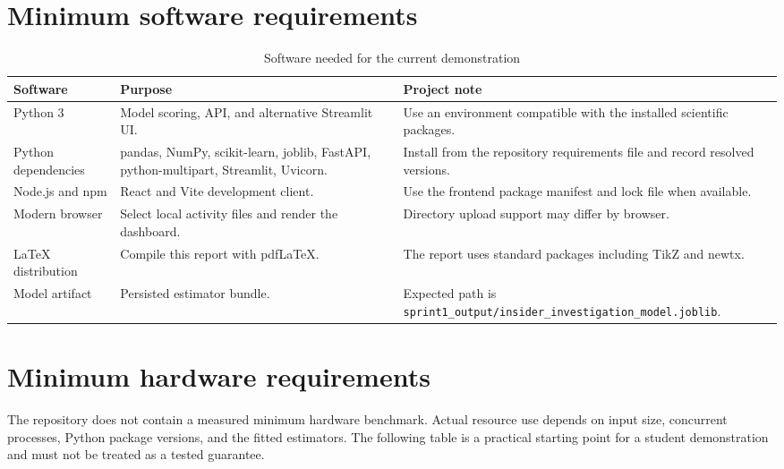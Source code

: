 \documentclass[12pt,a4paper,oneside]{report}
\newcommand{\tablefont}{\small}
\newcommand{\code}[1]{\texttt{\small #1}}
\begin{document}
\section{Minimum software requirements}
\label{app:software}
\begin{table}[H]
\centering
\tablefont
\caption{Software needed for the current demonstration}
\label{tab:software-requirements}
\begin{tabularx}{\textwidth}{|p{}|p{}|Y|}
\hline
\textbf{Software} & \textbf{Purpose} & \textbf{Project note}\\\hline
Python 3 & Model scoring, API, and alternative Streamlit UI. & Use an environment compatible with the installed scientific packages.\\\hline
Python dependencies & pandas, NumPy, scikit-learn, joblib, FastAPI, python-multipart, Streamlit, Uvicorn. & Install from the repository requirements file and record resolved versions.\\\hline
Node.js and npm & React and Vite development client. & Use the frontend package manifest and lock file when available.\\\hline
Modern browser & Select local activity files and render the dashboard. & Directory upload support may differ by browser.\\\hline
LaTeX distribution & Compile this report with pdfLaTeX. & The report uses standard packages including TikZ and newtx.\\\hline
Model artifact & Persisted estimator bundle. & Expected path is \code{sprint1\_output/insider\_investigation\_model.joblib}.\\\hline
\end{tabularx}
\end{table}

\section{Minimum hardware requirements}
\label{app:hardware}
The repository does not contain a measured minimum hardware
benchmark. Actual resource use depends on input size, concurrent
processes, Python package versions, and the fitted estimators. The
following table is a practical starting point for a student
demonstration and must not be treated as a tested guarantee.
\end{document}
